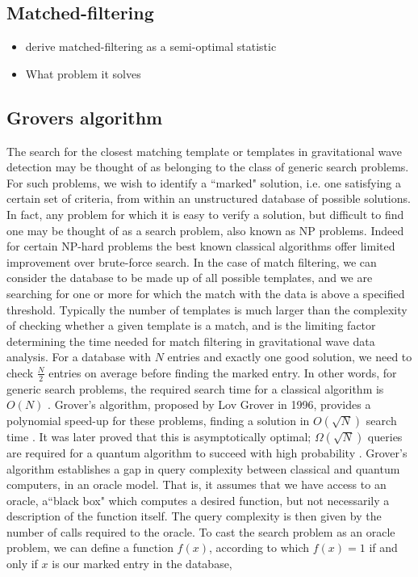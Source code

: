 \documentclass[aps,prd,nofootinbib,twocolumn,reprint,superscriptaddress,showpacs,showkeys,longbibliography]{revtex4-1}
\begin{document}
\subsection{Matched-filtering}

\begin{itemize}
\item derive matched-filtering as a semi-optimal statistic
\item What problem it solves
\end{itemize}

\subsection{Grovers algorithm}

The search for the closest matching template or templates in gravitational wave detection may be thought of as belonging to the class of generic search problems. For such problems, we wish to identify a ``marked" solution, i.e. one satisfying a certain set of criteria, from within an unstructured database of possible solutions. In fact, any problem for which it is easy to verify a solution, but difficult to find one may be thought of as a search problem, also known as NP problems. Indeed for certain NP-hard problems the best known classical algorithms offer limited improvement over brute-force search.\cite{bennett1997strengths} In the case of match filtering, we can consider the database to be made up of all possible templates, and we are searching for one or more for which the match with the data is above a specified threshold. Typically the number of templates is much larger than the complexity of checking whether a given template is a match, and is the limiting factor determining the time needed for match filtering in gravitational wave data analysis. For a database with $N$ entries and exactly one good solution, we need to check $\frac{N}{2}$ entries on average before finding the marked entry. In other words, for generic search problems, the required search time for a classical algorithm is $O(N)$ \cite{barnett2009quantum}. Grover's algorithm, proposed by Lov Grover in 1996, provides a polynomial speed-up for these problems, finding a solution in $O(\sqrt{N})$ search time \cite{grover1996fast}. It was later proved that this is asymptotically optimal; $\Omega(\sqrt{N})$ queries are required for a quantum algorithm to succeed with high probability \cite{bennett1997strengths}.
\newline\newline Grover's algorithm establishes a gap in query complexity between classical and quantum computers, in an oracle model. That is, it assumes that we have access to an oracle, a``black box" which computes a desired function, but not necessarily a description of the function itself. The query complexity is then given by the number of calls required to the oracle. To cast the search problem as an oracle problem, we can define a function $f(x)$, according to which $f(x)=1$ if and only if $x$ is our marked entry in the database, %
\end{document}
